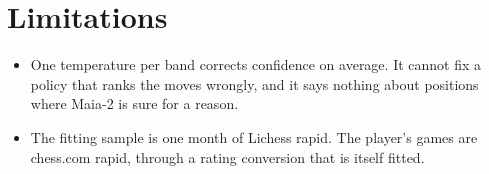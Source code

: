 \documentclass[11pt]{article}
\begin{document}
\section{Limitations}

\begin{itemize}[nosep]
\item One temperature per band corrects confidence on average. It cannot fix a policy that
ranks the moves wrongly, and it says nothing about positions where Maia-2 is sure for a reason.
\item The fitting sample is one month of Lichess rapid. The player's games are chess.com rapid,
through a rating conversion that is itself fitted.
\end{itemize}
\end{document}
